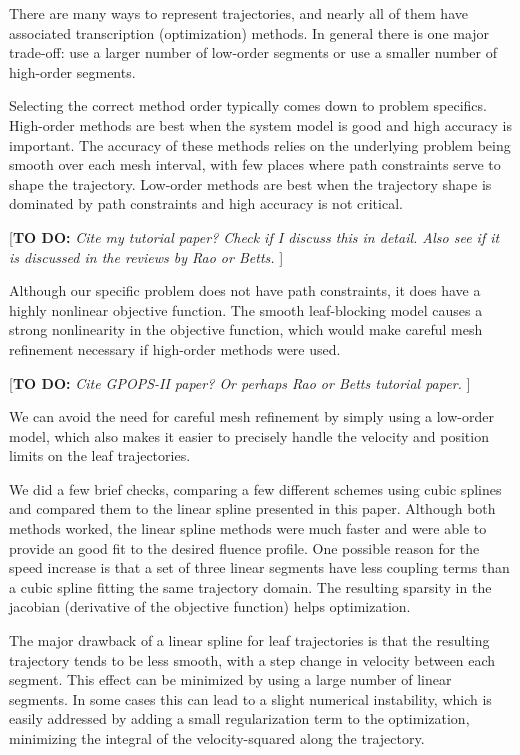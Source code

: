 \documentclass[12pt]{article}
\newcommand{\todo}[1]{{\color{lightblue}\par {[{\bf TO DO: } {\em #1}} ] \\    }}
\begin{document}
There are many ways to represent trajectories, and nearly all of them have associated transcription (optimization) methods.
In general there is one major trade-off:
use a larger number of low-order segments or
use a smaller number of high-order segments.

Selecting the correct method order typically comes down to problem specifics.
High-order methods are best when the system model is good and high accuracy is important.
The accuracy of these methods relies on the underlying problem being smooth over each
mesh interval, with few places where path constraints serve to shape the trajectory.
Low-order methods are best when the trajectory shape is dominated by path constraints and
high accuracy is not critical.
\todo{Cite my tutorial paper? Check if I discuss this in detail.
Also see if it is discussed in the reviews by Rao or Betts.}

Although our specific problem does not have path constraints, it does have a highly nonlinear objective function.
The smooth leaf-blocking model causes a strong nonlinearity in the objective function,
which would make careful mesh refinement necessary if high-order methods were used.
\todo{Cite GPOPS-II paper? Or perhaps Rao or Betts tutorial paper.}
We can avoid the need for careful mesh refinement by simply using a low-order model,
which also makes it easier to precisely handle the velocity and position limits on the leaf trajectories.

We did a few brief checks, comparing a few different schemes using cubic splines and compared them
to the linear spline presented in this paper. Although both methods worked, the linear spline methods
were much faster and were able to provide an good fit to the desired fluence profile.
One possible reason for the speed increase is that a set of three linear segments have less
coupling terms than a cubic spline fitting the same trajectory domain. The resulting sparsity in the
jacobian (derivative of the objective function) helps optimization. \cite{Betts}

The major drawback of a linear spline for leaf trajectories is that the resulting trajectory tends
to be less smooth, with a step change in velocity between each segment. This effect can be minimized
by using a large number of linear segments. In some cases this can lead to a slight numerical
instability, which is easily addressed by adding a small regularization term to the optimization,
minimizing the integral of the velocity-squared along the trajectory.
\end{document}
